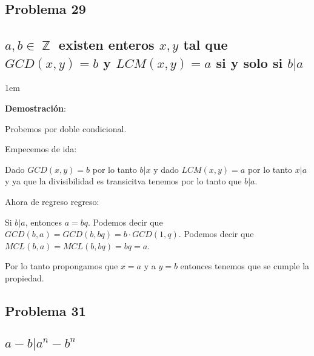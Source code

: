 \documentclass[12pt, fleqn]{article}                             %
\newenvironment{SmallIndentation}[1][0.75em]                    %
    {\begin{adjustwidth}{#1}{}\begin{footnotesize}}                 %
    {\end{footnotesize}\end{adjustwidth}}                           %
\DeclareMathOperator \Integers  {\mathbb{Z}}                     %
\begin{document}
    \subsection{Problema 29}
    \subsection*{$a, b \in \Integers$ existen enteros $x, y$ tal que
        $GCD(x, y) = b$  y $LCM(x, y) = a$ si y solo si $b|a$}

        \begin{SmallIndentation}[1em]
            \textbf{Demostración}:

            Probemos por doble condicional.

            Empecemos de ida:
            
            Dado $GCD(x, y) = b$ por lo tanto $b|x$ y dado $LCM(x, y) = a$ por lo tanto $x|a$
            y ya que la divisibilidad es transicitva tenemos por lo tanto que $b|a$.


            Ahora de regreso regreso:

            Si $b|a$, entonces $a = bq$.
            Podemos decir que $GCD(b, a) = GCD(b, bq) = b \cdot GCD(1, q)$.
            Podemos decir que $MCL(b, a) = MCL(b, bq) = bq = a$.

            Por lo tanto propongamos que $x=a$ y a $y=b$ entonces tenemos que 
            se cumple la propiedad.

        \end{SmallIndentation}


    \clearpage
    \subsection{Problema 31}
    \subsection*{$a - b |a^n - b^n$}
\end{document}
